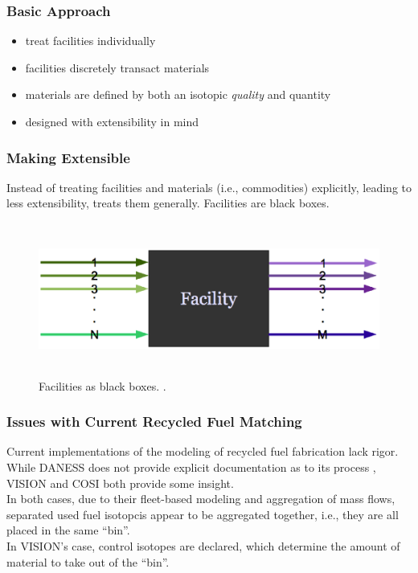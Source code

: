 \begin{frame}[ctb!]
  \frametitle{Basic \Cyclus Approach}

  \begin{itemize}
    \item treat facilities individually
    \item facilities discretely transact materials
    \item materials are defined by both an isotopic \textit{quality} and
      quantity
    \item designed with extensibility in mind
  \end{itemize}

\end{frame}

\begin{frame}[ctb!]
  \frametitle{Making \Cyclus Extensible}
  
  Instead of treating facilities and materials (i.e., commodities) explicitly,
  leading to less extensibility, \Cyclus treats them generally. Facilities are
  black boxes.
  
  \begin{figure}
    \includegraphics[height=5cm]{./images/facs.eps}
    \caption{Facilities as black boxes. \cite{cyclus2012}.}
    \label{fig:facs}  
  \end{figure}

\end{frame}

\begin{frame}[ctb!]
  \frametitle{Issues with Current Recycled Fuel Matching}
  
  Current implementations of the modeling of recycled fuel fabrication lack
  rigor.\\

  While DANESS does not provide explicit documentation as to its process
  \cite{durpel_daness_2003}, VISION and COSI both provide some insight.\\

  In both cases, due to their fleet-based modeling and aggregation of mass
  flows, separated used fuel isotopcis appear to be aggregated together, i.e.,
  they are all placed in the same ``bin''.\\

  In VISION's case, control isotopes are declared, which determine the amount of
  material to take out of the ``bin''.\cite{yacout_vision_2006}
\end{frame}

